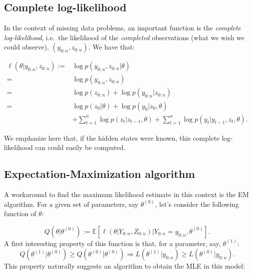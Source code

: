 \documentclass[
]{book}
\begin{document}
\hypertarget{complete-log-likelihood}{%
\subsection{Complete log-likelihood}\label{complete-log-likelihood}}

In the context of missing data problems, an important function is the \emph{complete log-likelihood}, i.e.~the likelihood of the \emph{completed} observations (what we wish we could observe), \((y_{0:n}, z_{0:n})\).
We have that:

\begin{align}
\ell(\theta \vert y_{0:n}, z_{0:n}) :=& \log p(y_{0:n}, z_{0:n} \vert \theta) \nonumber \\
=& \log p(y_{0:n}, z_{0:n}) \nonumber \\
=& \log p(z_{0:n}) + \log p(y_{0:n}\vert z_{0:n}) \nonumber \\
=&  \log p(z_0 \vert \theta) + \log p(y_0\vert z_0, \theta) \nonumber \\
&+ \sum_{t = 1}^n \log p(z_{t} \vert z_{t - 1}, \theta) + \sum_{t = 1}^n \log p(y_{t}\vert y_{t -1}, z_{t}, \theta)  \label{eq:AR-HMM-complete-log-likelihood}.
\end{align}

We emphasize here that, if the hidden states were known, this complete log-likelihood can could easily be computed.

\hypertarget{expectation-maximization-algorithm}{%
\subsection{Expectation-Maximization algorithm}\label{expectation-maximization-algorithm}}

A workaround to find the maximum likelihood estimate in this context is the EM algorithm.
For a given set of parameters, say \(\theta^{(0)}\), let's consider the following function of \(\theta\):

\begin{equation}
Q(\theta \vert \theta^{(0)}) := \mathbb{E}[\ell(\theta \vert Y_{0:n}, Z_{0:n}) \vert Y_{0:n} = y_{0:n}, \theta^{(0)}] \label{eq:E-step-function}.
\end{equation}
A first interesting property of this function is that, for a parameter, say, \(\theta^{(1)}\):
\[Q(\theta^{(1)} \vert \theta^{(0)}) \geq Q(\theta^{(0)} \vert \theta^{(0)}) \Rightarrow L(\theta^{(1)} \vert y_{0:n}) \geq L(\theta^{(0)} \vert y_{0:n}).\]
This property naturally suggests an algorithm to obtain the MLE in this model:
\end{document}
